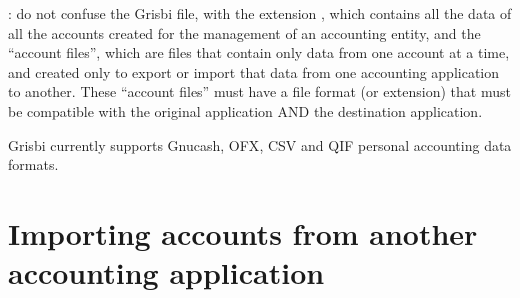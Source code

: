 \Note{}: do not confuse the Grisbi file, with the \gls{extension} , which contains all the data of all the accounts created for the management of an accounting entity, and the \enquote{account files}, which are files that contain only data from one account at a time, and created only to export or import that data from one accounting application to another. These \enquote{account files} must have a \gls{file format} (or \gls{extension}) that must be compatible with the original application AND the destination application.



Grisbi currently supports \gls{Gnucash}, \gls{OFX}, \gls{CSV} and \gls{QIF} personal accounting data formats.


\section{Importing accounts from another accounting application\label{importexport-import}}



